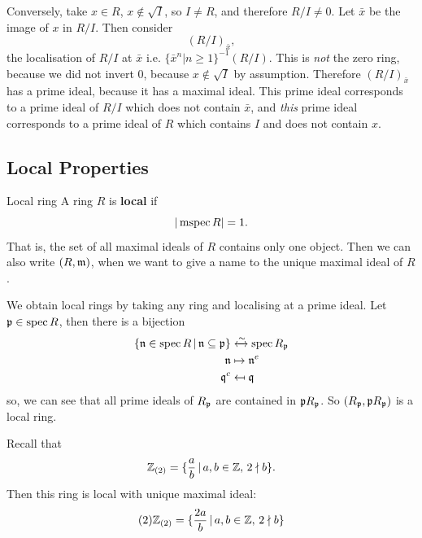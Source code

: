 \documentclass{article}
\begin{document}
Conversely, take $x \in R$, $x \notin \sqrt{I}$, so $I \neq R$, and therefore $R/I \neq 0$. Let $\bar x$ be the image of $x$ in $R/I$. Then consider \[ (R/I)_{\bar x},\] the localisation of $R/I$ at $\bar x$ i.e. $\{\bar x^{n} | n \geq 1\}^{-1}(R/I)$. This is \textit{not} the zero ring, because we did not invert $0$, because $x \notin \sqrt{I}$ by assumption. Therefore $(R/I)_{\bar x}$ has a prime ideal, because it has a maximal ideal. This prime ideal corresponds to a prime ideal of $R/I$ which does not contain $\bar x$, and \textit{this} prime ideal corresponds to a prime ideal of $R$ which contains $I$ and does not contain $x$.

\subsection{Local Properties}
\begin{fancydefine}{Local ring}
    A ring \newlec $R$ is \textbf{local} if \[ |\operatorname{mspec} R| = 1.\] That is, the set of all maximal ideals of $R$ contains only one object. \gap 
    Then we can also write $(R,\mathfrak{m})$, when we want to give a name to the unique maximal ideal of $R$.
\end{fancydefine}
\begin{ex}
    We obtain local rings by taking any ring and localising at a prime ideal. Let $\mathfrak{p} \in \operatorname{spec} R$, then there is a bijection 
    \begin{align*}
        \{\mathfrak{n} \in \operatorname{spec} R \, | \, \mathfrak{n} \subseteq \mathfrak{p} \} &\xleftrightarrow{\sim} \operatorname{spec} R_{\mathfrak{p}} \\
        \mathfrak{n} &\mapsto \mathfrak{n}^{e}\\
        \mathfrak{q}^{c} &\mapsfrom \mathfrak{q} 
    \end{align*}
    so, we can see that all prime ideals of $R_{\mathfrak{p}}$ are contained in $\mathfrak{p} R_{\mathfrak{p}}$. So $(R_{\mathfrak{p}},\mathfrak{p} R_{\mathfrak{p}})$ is a local ring.
\end{ex}
\begin{ex}
    Recall that \[\mathbb{Z}_{(2)} = \{ \frac{a}{b} \, | \, a,b \in \mathbb{Z}, \, 2 \nmid b\}.\] Then this ring is local with unique maximal ideal: \[ (2)\mathbb{Z}_{(2)}=\{\frac{2a}{b} \, | \, a,b \in \mathbb{Z}, \, 2 \nmid b\} \]
\end{ex}
\end{document}

